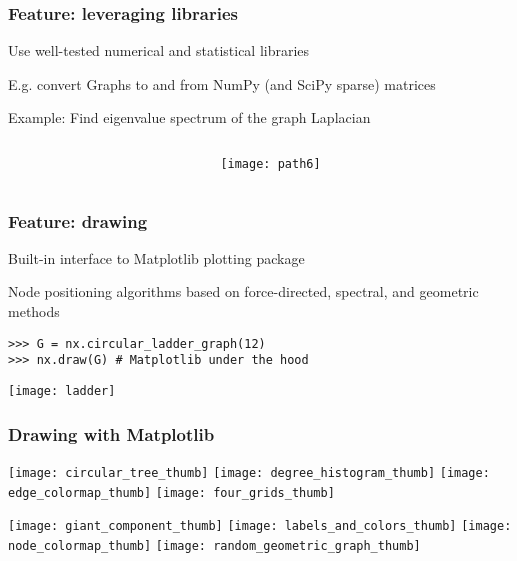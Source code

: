 \begin{frame}[fragile]

\frametitle{Feature: leveraging libraries}

Use well-tested numerical and statistical libraries

E.g. convert Graphs to and from  NumPy (and SciPy sparse) matrices

Example: Find eigenvalue spectrum of the graph Laplacian

\begin{columns}[T]
\begin{column}{0.75\textwidth}

\begin{block}{}

\end{block}
\end{column}
\begin{column}{0.2\textwidth}
\centerline{\texttt{[image: path6]}}
\end{column}

\end{columns}

\end{frame}

\begin{frame}[fragile]
\frametitle{Feature: drawing}

Built-in interface to Matplotlib plotting package

Node positioning algorithms based on force-directed, spectral, and geometric methods

\begin{block}{}
\begin{verbatim}
>>> G = nx.circular_ladder_graph(12)
>>> nx.draw(G) # Matplotlib under the hood
\end{verbatim}
\end{block}
\centerline{\texttt{[image: ladder]}}

\end{frame}


\begin{frame}[fragile]
\frametitle{Drawing with Matplotlib}

\texttt{[image: circular\_tree\_thumb]}
\texttt{[image: degree\_histogram\_thumb]}
\texttt{[image: edge\_colormap\_thumb]}
\texttt{[image: four\_grids\_thumb]}

\texttt{[image: giant\_component\_thumb]}
\texttt{[image: labels\_and\_colors\_thumb]}
\texttt{[image: node\_colormap\_thumb]}
\texttt{[image: random\_geometric\_graph\_thumb]}

\end{frame}
